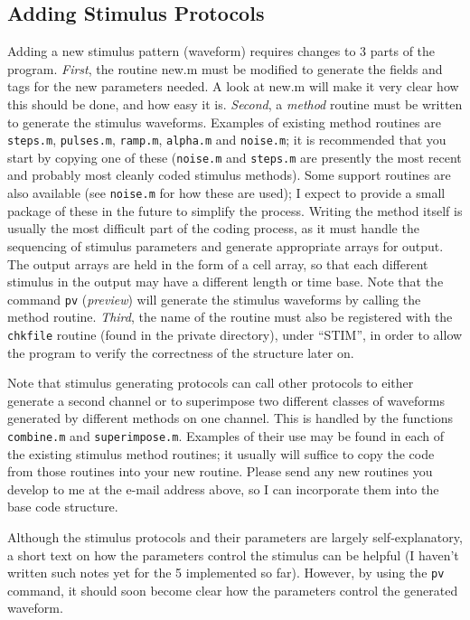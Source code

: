 \documentclass[11pt, letterpaper, titlepage]{paper}
\begin{document}
\subsection{Adding Stimulus Protocols}
Adding a new stimulus pattern (waveform) requires changes to 3 
parts of the program. \textit{First}, the routine new.m must be 
modified to generate the fields and tags for the new parameters 
needed. A look at new.m will make it very clear how this should be 
done, and how easy it is. \textit{Second}, a \textit{method} 
routine must be written to generate the stimulus waveforms. 
Examples of existing method routines are \texttt{steps.m}, 
\texttt{pulses.m}, \texttt{ramp.m}, \texttt{alpha.m} and 
\texttt{noise.m}; it is recommended that you start by copying one 
of these (\texttt{noise.m} and \texttt{steps.m} are presently the 
most recent and probably most cleanly coded stimulus methods). 
Some support routines are also available (see \texttt{noise.m} for 
how these are used); I expect to provide a small package of these 
in the future to simplify the process. Writing the method itself 
is usually the most difficult part of the coding process, as it 
must handle the sequencing of stimulus parameters and generate 
appropriate arrays for output. The output arrays are held in the 
form of a cell array, so that each different stimulus in the 
output may have a different length or time base. Note that the 
command \texttt{pv} (\textsl{preview}) will generate the stimulus 
waveforms by calling the method routine. \textit{Third}, the name 
of the routine must also be registered with the \texttt{chkfile} 
routine (found in the private directory), under ``STIM'', in order 
to allow the program to verify the correctness of the structure 
later on.

Note that stimulus generating protocols can call other protocols 
to either generate a second channel or to superimpose two 
different classes of waveforms generated by different methods on 
one channel. This is handled by the functions \texttt{combine.m} 
and \texttt{superimpose.m}. Examples of their use may be found in 
each of the existing stimulus method routines; it usually will 
suffice to copy the code from those routines into your new 
routine. Please send any new routines you develop to me at the 
e-mail address above, so I can incorporate them into the base code 
structure.

Although the stimulus protocols and their parameters are largely self-explanatory, a 
short text on how the parameters control the stimulus can be helpful (I haven't written 
such notes yet for the 5 implemented so far). However, by using the \texttt{pv} command, 
it should soon become clear how the parameters control the generated waveform.
\end{document}
